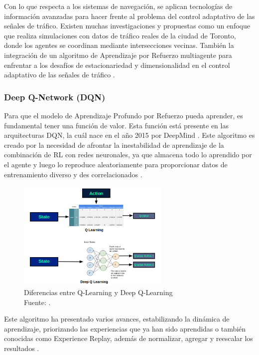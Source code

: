 Con lo que respecta a los sistemas de navegación, se aplican tecnologías de información avanzadas para hacer frente al problema del control adaptativo de las señales de tráfico. Existen muchas investigaciones y propuestas como un enfoque que realiza simulaciones con datos de tráfico reales de la ciudad de Toronto, donde los agentes se coordinan mediante intersecciones vecinas. También la integración de un algoritmo de Aprendizaje por Refuerzo multiagente para enfrentar a los desafíos de estacionariedad y dimensionalidad en el control adaptativo de las señales de tráfico \parencite{pr_artiDeep}.

\subsubsection{Deep Q-Network (DQN)}
Para que el modelo de Aprendizaje Profundo por Refuerzo pueda aprender, es fundamental tener una función de valor. Esta función está presente en las arquitecturas DQN, la cuál nace en el año 2015 por DeepMind \parencite{pr_artiDeep}. Este algoritmo es creado por la necesidad de afrontar la inestabilidad de aprendizaje de la combinación de RL con redes neuronales, ya que almacena todo lo aprendido por el agente y luego lo reproduce aleatoriamente para proporcionar datos de entrenamiento diverso y des correlacionados \parencite{gl_DeepMind}. 

\begin{figure}[h]
	\begin{center}
		\includegraphics[width=0.65\textwidth]{2/MT/5.png}
		\caption{Diferencias entre Q-Learning y Deep Q-Learning \\
			Fuente: \citep*{gl_Damavis}. }
		\label{1:fig2}
	\end{center}
\end{figure}

Este algoritmo ha presentado varios avances, estabilizando la dinámica de aprendizaje, priorizando las experiencias que ya han sido aprendidas o también conocidas como Experience Replay, además de normalizar, agregar y reescalar los resultados \parencite{gl_DeepMind}. 

